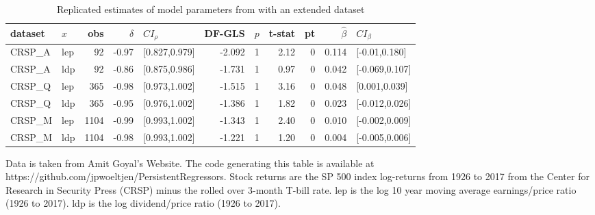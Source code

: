 \documentclass[11pt, a4paper]{article}
\begin{document}
\begin{table}[h!]
\small
\setlength\tabcolsep{5.3pt}
\centering
\caption{Replicated estimates of model parameters from \citet{campbell2006efficient} with an extended dataset}
\label{tab:extended}
\begin{threeparttable}
\begin{tabular}{llrrlrrrrrl}
  \hline
dataset & $x$ & obs & $\hat{\delta}$ & $CI_{\rho}$ & DF-GLS & $p$ &t-stat & pt & $\hat{\beta}$ & $CI_{\beta}$ \\ 
  \hline
    CRSP\_A  & lep & 92 & -0.97 & [0.827,0.979] & -2.092 & 1 & 2.12 & 0 & 0.114 & [-0.01,0.180] \\ 
    CRSP\_A  & ldp & 92 & -0.86 & [0.875,0.986] & -1.731 & 1 & 0.97 & 0 & 0.042 & [-0.069,0.107] \\ 
   CRSP\_Q & lep & 365 & -0.98 & [0.973,1.002] & -1.515 & 1 & 3.16 & 0 & 0.048 & [0.001,0.039] \\ 
  CRSP\_Q & ldp & 365 & -0.95 & [0.976,1.002] & -1.386 & 1 & 1.82 & 0 & 0.023 & [-0.012,0.026] \\ 
  CRSP\_M & lep & 1104 & -0.99 & [0.993,1.002] & -1.343 & 1 & 2.40 & 0 & 0.010 & [-0.002,0.009] \\ 
  CRSP\_M & ldp & 1104 & -0.98 & [0.993,1.002] & -1.221 & 1 & 1.20 & 0 & 0.004 & [-0.005,0.006] \\ 
\hline
\end{tabular}
 \begin{tablenotes}
 \small
\item Data is taken from Amit Goyal’s Website. The code generating this table is available at https://github.com/jpwoeltjen/PersistentRegressors. Stock returns are the SP 500 index log-returns from 1926 to 2017 from the Center for Research in Security Press (CRSP) minus the rolled over 3-month T-bill rate. lep is the log 10 year moving average earnings/price ratio (1926 to 2017). ldp is the log dividend/price ratio (1926 to 2017).

\end{tablenotes}
\end{threeparttable}
\end{table}
\end{document}
